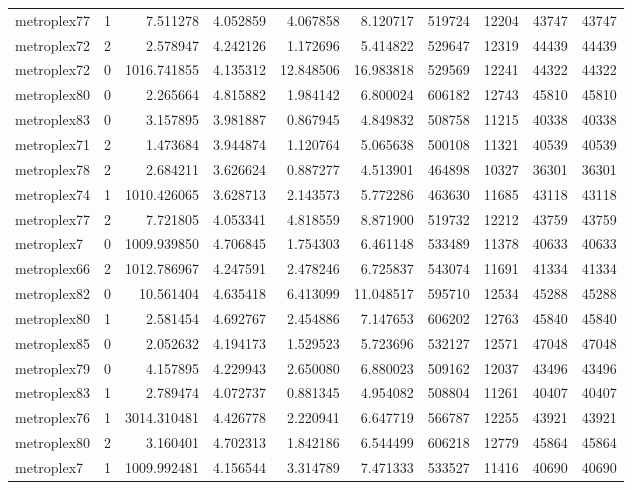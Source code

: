\begin{longtable}{|l|r|r|r|r|r|r|r|r|r|}
metroplex77 & 1 & 7.511278 & 4.052859 & 4.067858 & 8.120717 & 519724 & 12204 & 43747 & 43747 \\
metroplex72 & 2 & 2.578947 & 4.242126 & 1.172696 & 5.414822 & 529647 & 12319 & 44439 & 44439 \\
metroplex72 & 0 & 1016.741855 & 4.135312 & 12.848506 & 16.983818 & 529569 & 12241 & 44322 & 44322 \\
metroplex80 & 0 & 2.265664 & 4.815882 & 1.984142 & 6.800024 & 606182 & 12743 & 45810 & 45810 \\
metroplex83 & 0 & 3.157895 & 3.981887 & 0.867945 & 4.849832 & 508758 & 11215 & 40338 & 40338 \\
metroplex71 & 2 & 1.473684 & 3.944874 & 1.120764 & 5.065638 & 500108 & 11321 & 40539 & 40539 \\
metroplex78 & 2 & 2.684211 & 3.626624 & 0.887277 & 4.513901 & 464898 & 10327 & 36301 & 36301 \\
metroplex74 & 1 & 1010.426065 & 3.628713 & 2.143573 & 5.772286 & 463630 & 11685 & 43118 & 43118 \\
metroplex77 & 2 & 7.721805 & 4.053341 & 4.818559 & 8.871900 & 519732 & 12212 & 43759 & 43759 \\
metroplex7 & 0 & 1009.939850 & 4.706845 & 1.754303 & 6.461148 & 533489 & 11378 & 40633 & 40633 \\
metroplex66 & 2 & 1012.786967 & 4.247591 & 2.478246 & 6.725837 & 543074 & 11691 & 41334 & 41334 \\
metroplex82 & 0 & 10.561404 & 4.635418 & 6.413099 & 11.048517 & 595710 & 12534 & 45288 & 45288 \\
metroplex80 & 1 & 2.581454 & 4.692767 & 2.454886 & 7.147653 & 606202 & 12763 & 45840 & 45840 \\
metroplex85 & 0 & 2.052632 & 4.194173 & 1.529523 & 5.723696 & 532127 & 12571 & 47048 & 47048 \\
metroplex79 & 0 & 4.157895 & 4.229943 & 2.650080 & 6.880023 & 509162 & 12037 & 43496 & 43496 \\
metroplex83 & 1 & 2.789474 & 4.072737 & 0.881345 & 4.954082 & 508804 & 11261 & 40407 & 40407 \\
metroplex76 & 1 & 3014.310481 & 4.426778 & 2.220941 & 6.647719 & 566787 & 12255 & 43921 & 43921 \\
metroplex80 & 2 & 3.160401 & 4.702313 & 1.842186 & 6.544499 & 606218 & 12779 & 45864 & 45864 \\
metroplex7 & 1 & 1009.992481 & 4.156544 & 3.314789 & 7.471333 & 533527 & 11416 & 40690 & 40690 \\

\end{longtable}
